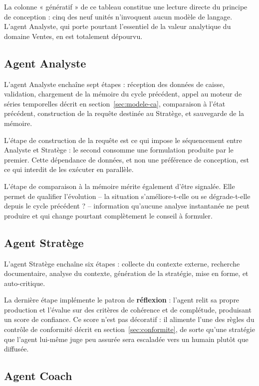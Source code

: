 La colonne « génératif » de ce tableau constitue une lecture directe du principe de conception : cinq des neuf unités n'invoquent aucun modèle de langage. L'agent Analyste, qui porte pourtant l'essentiel de la valeur analytique du domaine Ventes, en est totalement dépourvu.

\subsection{Agent Analyste}

L'agent Analyste enchaîne sept étapes : réception des données de caisse, validation, chargement de la mémoire du cycle précédent, appel au moteur de séries temporelles décrit en section~\ref{sec:modele-ca}, comparaison à l'état précédent, construction de la requête destinée au Stratège, et sauvegarde de la mémoire.

L'étape de construction de la requête est ce qui impose le séquencement entre Analyste et Stratège : le second consomme une formulation produite par le premier. Cette dépendance de données, et non une préférence de conception, est ce qui interdit de les exécuter en parallèle.

L'étape de comparaison à la mémoire mérite également d'être signalée. Elle permet de qualifier l'évolution -- la situation s'améliore-t-elle ou se dégrade-t-elle depuis le cycle précédent ? -- information qu'aucune analyse instantanée ne peut produire et qui change pourtant complètement le conseil à formuler.

\subsection{Agent Stratège}

L'agent Stratège enchaîne six étapes : collecte du contexte externe, recherche documentaire, analyse du contexte, génération de la stratégie, mise en forme, et auto-critique.

La dernière étape implémente le patron de \textbf{réflexion} \cite{yao2023react} : l'agent relit sa propre production et l'évalue sur des critères de cohérence et de complétude, produisant un score de confiance. Ce score n'est pas décoratif : il alimente l'une des règles du contrôle de conformité décrit en section~\ref{sec:conformite}, de sorte qu'une stratégie que l'agent lui-même juge peu assurée sera escaladée vers un humain plutôt que diffusée.

\subsection{Agent Coach}

